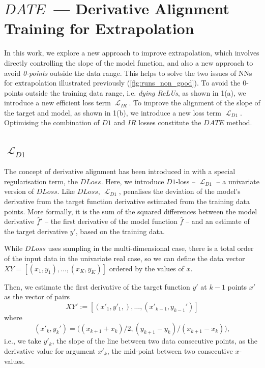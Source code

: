 \documentclass[runningheads]{llncs}
\DeclareMathOperator{\Lagr}{\mathcal{L}}
\begin{document}
\section{$DATE$~--- Derivative Alignment Training for Extrapolation}

In this work, we explore a new approach to improve extrapolation, which involves directly controlling the slope of the model function, and also a new approach to avoid \emph{0-points} outside the data range.
This helps to solve the two issues of NNs for extrapolation illustrated previously (\autoref{fig:runs_non_good}). 
To avoid the 0-points outside the training data range, i.e. \emph{dying ReLUs}, as shown in 1(a), we introduce a new efficient loss term $\Lagr_{IR}$.
To improve the alignment of the slope of the target and model, as shown in 1(b), we introduce a new loss term $\Lagr_{D1}$. 
Optimising the combination of $D1$ and $IR$ losses constitute the $DATE$ method.

\subsection{$\Lagr_{D1}$ }

The concept of derivative alignment has been introduced in \cite{lopedoto2024derivativebased} with a special regularisation term, the $DLoss$.
Here, we introduce $D1$-loss -- $\Lagr_{D1}$ -- a univariate version of $DLoss$. 
Like $DLoss$, $\Lagr_{D1}$, penalises the deviation of the model's derivative from the target function derivative estimated from the training data points.
More formally, it is the sum of the squared differences between the model derivative $\hat{f}'$ -- the first derivative of the model function $\hat{f}$ -- and an estimate of the target derivative $y'$, based on the training data.

While $DLoss$ uses sampling in the multi-dimensional case, there is a total order of the input data in the univariate real case, so we can define the data vector $XY = [(x_1,y_1), \ldots , (x_K,y_K)]$ ordered by the values of $x$.

Then, we estimate the first derivative of the target function $y'$ at $k-1$ points $x'$ as the vector of pairs 
\begin{equation}
 XY' := [(x'_1,y'_1,), \ldots , (x'_{k-1},y_{k-1}')] 
\end{equation}
where 
\begin{equation}
 (x'_k,y_k') = \bigg((x_{k+1}+x_k)/2,(y_{k+1}-y_{k})/(x_{k+1}-x_{k})\bigg) ,
\end{equation}
i.e., we take $y'_k$, the slope of the line between two data consecutive points, as the derivative value for argument $x'_k$, the mid-point between two consecutive $x$-values.
\end{document}

